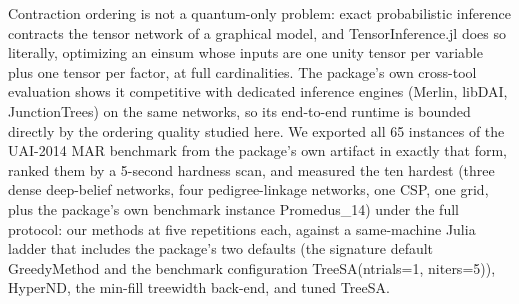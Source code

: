 \documentclass{SciPost}
\begin{document}
Contraction ordering is not a quantum-only problem: exact probabilistic
inference contracts the tensor network of a graphical model, and
TensorInference.jl \cite{roa_2023_tensorinference} does so literally,
optimizing an einsum whose inputs are one unity tensor per variable plus
one tensor per factor, at full cardinalities. The package's own
cross-tool evaluation \cite{tibenchmarks_2023} shows it competitive
with dedicated inference engines (Merlin, libDAI, JunctionTrees) on the
same networks, so its end-to-end runtime is bounded directly by the
ordering quality studied here. We exported all 65
instances of the UAI-2014 MAR benchmark from the package's own artifact
in exactly that form, ranked them by a 5-second hardness scan, and
measured the ten hardest (three dense deep-belief networks, four
pedigree-linkage networks, one CSP, one grid, plus the package's own
benchmark instance Promedus\_14) under the full protocol: our methods at
five repetitions each, against a same-machine Julia ladder that includes
the package's two defaults (the signature default GreedyMethod and the
benchmark configuration TreeSA(ntrials=1, niters=5)), HyperND, the
min-fill treewidth back-end, and tuned TreeSA.
\end{document}

